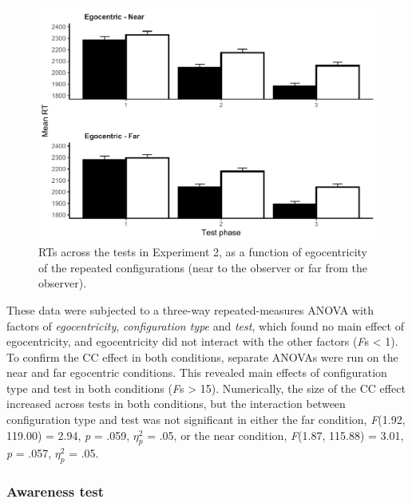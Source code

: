 \documentclass[
  english,
  man,floatsintext]{apa7}
\begin{document}
\begin{figure}

{\centering \includegraphics[width=1\linewidth]{CCVR_manuscript_files/figure-latex/Exp2-ego-figure-1} 

}

\caption{RTs across the tests in Experiment 2, as a function of egocentricity of the repeated configurations (near to the observer or far from the observer).}\label{fig:Exp2-ego-figure}
\end{figure}

These data were subjected to a three-way repeated-measures ANOVA with factors of \emph{egocentricity}, \emph{configuration type} and \emph{test}, which found no main effect of egocentricity, and egocentricity did not interact with the other factors (\emph{F}s \textless{} 1). To confirm the CC effect in both conditions, separate ANOVAs were run on the near and far egocentric conditions. This revealed main effects of configuration type and test in both conditions (\emph{F}s \textgreater{} 15). Numerically, the size of the CC effect increased across tests in both conditions, but the interaction between configuration type and test was not significant in either the far condition, \emph{F}(1.92, 119.00) = 2.94, \emph{p} = .059, \(\eta^2_p\) = .05, or the near condition, \emph{F}(1.87, 115.88) = 3.01, \emph{p} = .057, \(\eta^2_p\) = .05.

\hypertarget{awareness-test}{%
\subsubsection{Awareness test}\label{awareness-test}}
\end{document}
